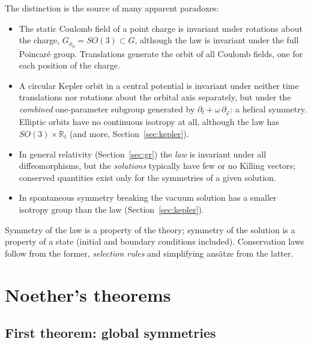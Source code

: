 The distinction is the source of many apparent paradoxes:
\begin{itemize}[leftmargin=1.6em,itemsep=2pt]
\item The static Coulomb field of a point charge is invariant under rotations
  about the charge, $G_{\phi_0}=SO(3)\subset G$, although the law is invariant
  under the full Poincar\'e group. Translations generate the orbit of all
  Coulomb fields, one for each position of the charge.
\item A circular Kepler orbit in a central potential is invariant under
  neither time translations nor rotations about the orbital axis separately,
  but under the \emph{combined} one-parameter subgroup generated by
  $\partial_t+\omega\,\partial_\varphi$: a helical symmetry. Elliptic orbits
  have no continuous isotropy at all, although the law has $SO(3)\times
  \mathbb R_t$ (and more, Section~\ref{sec:kepler}).
\item In general relativity (Section~\ref{sec:gr}) the \emph{law} is invariant
  under all diffeomorphisms, but the \emph{solutions} typically have few or no
  Killing vectors; conserved quantities exist only for the symmetries of a
  given solution.
\item In spontaneous symmetry breaking the vacuum solution has a smaller
  isotropy group than the law (Section~\ref{sec:kepler}).
\end{itemize}
Symmetry of the law is a property of the theory; symmetry of the solution is a
property of a state (initial and boundary conditions included). Conservation
laws follow from the former, \emph{selection rules} and simplifying ans\"atze
from the latter.

\section{Noether's theorems}
\label{sec:noether}

\subsection{First theorem: global symmetries}

